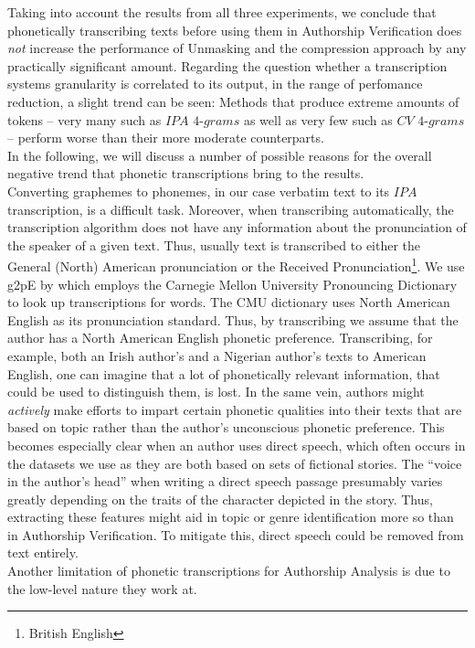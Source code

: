 Taking into account the results from all three experiments, we conclude that phonetically transcribing texts before using them in Authorship Verification does \textit{not} increase the performance of Unmasking and the compression approach by any practically significant amount.
Regarding the question whether a transcription systems granularity is correlated to its output, in the range of perfomance reduction, a slight trend can be seen:
Methods that produce extreme amounts of tokens -- very many such as $IPA$ $4$-$grams$ as well as very few such as $CV$ $4$-$grams$ -- perform worse than their more moderate counterparts.\\
In the following, we will discuss a number of possible reasons for the overall negative trend that phonetic transcriptions bring to the results.\\
Converting graphemes to phonemes, in our case verbatim text to its $IPA$ transcription, is a difficult task.
Moreover, when transcribing automatically, the transcription algorithm does not have any information about the pronunciation of the speaker of a given text.
Thus, usually text is transcribed to either the General (North) American pronunciation or the Received Pronunciation\footnote{British English}.
We use g2pE by \cite{kyubyong2019g2pE} which employs the Carnegie Mellon University Pronouncing Dictionary to look up transcriptions for words.
The CMU dictionary uses North American English as its pronunciation standard.
Thus, by transcribing we assume that the author has a North American English phonetic preference.
Transcribing, for example, both an Irish author's and a Nigerian author's texts to American English, one can imagine that a lot of phonetically relevant information, that could be used to distinguish them, is lost.
In the same vein, authors might \textit{actively} make efforts to impart certain phonetic qualities into their texts that are based on topic rather than the author's unconscious phonetic preference.
This becomes especially clear when an author uses direct speech, which often occurs in the datasets we use as they are both based on sets of fictional stories.
The ``voice in the author's head'' when writing a direct speech passage presumably varies greatly depending on the traits of the character depicted in the story.
Thus, extracting these features might aid in topic or genre identification more so than in Authorship Verification.
To mitigate this, direct speech could be removed from text entirely.\\
Another limitation of phonetic transcriptions for Authorship Analysis is due to the low-level nature they work at.
